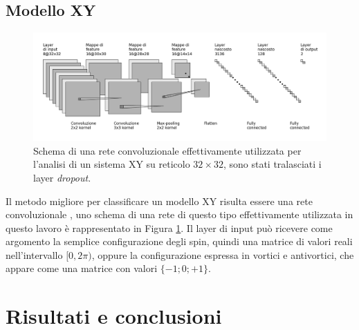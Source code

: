 \documentclass{article}
\begin{document}
\subsection{Modello XY}

\begin{figure}
 \centerline{\includegraphics[scale=0.35]{cnn.png}}
 \label{fig:cnn}
 \caption{Schema di una rete convoluzionale effettivamente utilizzata per l'analisi di un sistema XY su reticolo $32\times32$, sono stati tralasciati i layer \emph{dropout}.}
\end{figure}

Il metodo migliore per classificare un modello XY risulta essere una rete convoluzionale \cite{melko}, uno schema di una rete di questo tipo effettivamente utilizzata in questo lavoro è rappresentato in Figura \ref{fig:cnn}.
Il layer di input può ricevere come argomento la semplice configurazione degli spin, quindi una matrice di valori reali nell'intervallo $[0,2\pi)$, oppure la configurazione espressa in vortici e antivortici, che appare come una matrice con valori $\{-1;0;+1\}$.



\section{Risultati e conclusioni}
\end{document}
